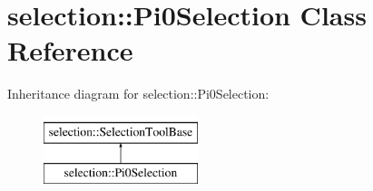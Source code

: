 \hypertarget{classselection_1_1Pi0Selection}{}\section{selection\+:\+:Pi0\+Selection Class Reference}
\label{classselection_1_1Pi0Selection}
Inheritance diagram for selection\+:\+:Pi0\+Selection\+:\begin{figure}[H]
\begin{center}
\leavevmode
\includegraphics[height=2.000000cm]{classselection_1_1Pi0Selection}
\end{center}
\end{figure}
